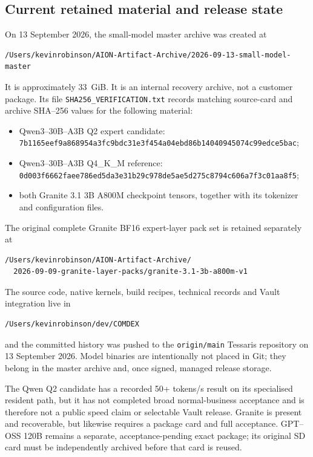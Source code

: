 \subsection{Current retained material and release state}

On 13 September 2026, the small-model master archive was created at
\begin{verbatim}
/Users/kevinrobinson/AION-Artifact-Archive/2026-09-13-small-model-master
\end{verbatim}
It is approximately 33~GiB.  It is an internal recovery archive, not a
customer package.  Its file \texttt{SHA256\_VERIFICATION.txt} records matching
source-card and archive SHA--256 values for the following material:
\begin{itemize}
  \item Qwen3--30B--A3B Q2 expert candidate:
  \texttt{7b1165eef9a868954a3fc9bdc31e3f454a04ebd86b14040945074c99edce5bac};
  \item Qwen3--30B--A3B Q4\_K\_M reference:
  \texttt{0d003f6662faee786ed5da3e31b29c978de5ae5d275c8794c606a7f3c01aa8f5};
  \item both Granite 3.1 3B A800M checkpoint tensors, together with its
  tokenizer and configuration files.
\end{itemize}

The original complete Granite BF16 expert-layer pack set is retained separately
at
\begin{verbatim}
/Users/kevinrobinson/AION-Artifact-Archive/
  2026-09-09-granite-layer-packs/granite-3.1-3b-a800m-v1
\end{verbatim}
The source code, native kernels, build recipes, technical records and Vault
integration live in
\begin{verbatim}
/Users/kevinrobinson/dev/COMDEX
\end{verbatim}
and the committed history was pushed to the \texttt{origin/main} Tessaris
repository on 13 September 2026.  Model binaries are intentionally not placed
in Git; they belong in the master archive and, once signed, managed release
storage.

The Qwen Q2 candidate has a recorded 50+ tokens/s result on its specialised
resident path, but it has not completed broad normal-business acceptance and is
therefore not a public speed claim or selectable Vault release.  Granite is
present and recoverable, but likewise requires a package card and full
acceptance.  GPT--OSS 120B remains a separate, acceptance-pending exact package;
its original SD card must be independently archived before that card is reused.

